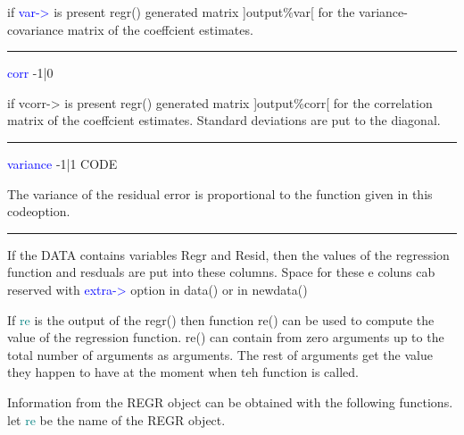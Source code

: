 \begin{changemargin}{3cm}{0cm}
\noindent  if \textcolor{blue}{var->} is present \textcolor{VioletRed}{regr}() generated matrix ]output\%var[ for
the variance-covariance matrix of the coeffcient estimates.
\end{changemargin}
\vspace{0.3cm}
\hrule
\vspace{0.3cm}
\noindent \textcolor{blue}{corr} \tabto{3cm} -1|0 \tabto{5cm}    \tabto{7cm}
\begin{changemargin}{3cm}{0cm}
\noindent  if vcorr-> is present \textcolor{VioletRed}{regr}() generated matrix ]output\%corr[ for
the correlation matrix of the coeffcient estimates. Standard deviations
are put to the diagonal.
\end{changemargin}
\vspace{0.3cm}
\hrule
\vspace{0.3cm}
\noindent \textcolor{blue}{variance} \tabto{3cm} -1|1 \tabto{5cm}  CODE \tabto{7cm}
\begin{changemargin}{3cm}{0cm}
\noindent The variance of the residual error is proportional to the function
given in this codeoption.
\end {changemargin}
\hrule
\vspace{0.2cm}
\begin{note}
If the DATA contains variables Regr and Resid, then the values of
the regression function and resduals are put into these columns. Space for these e
coluns cab reserved with \textcolor{blue}{extra->} option in \textcolor{VioletRed}{data}() or in \textcolor{VioletRed}{newdata}()
\end{note}
\begin{note}
If \textcolor{teal}{re} is the output of the \textcolor{VioletRed}{regr}() then function re() can be used to compute
the value of the regression function. re() can contain from zero arguments up to the
total number of arguments as arguments. The rest of arguments get
the value they happen to have at the moment when teh function is called.
\end{note}
Information from the REGR object can be obtained with the following functions.
let \textcolor{teal}{re} be the name of the REGR object.
